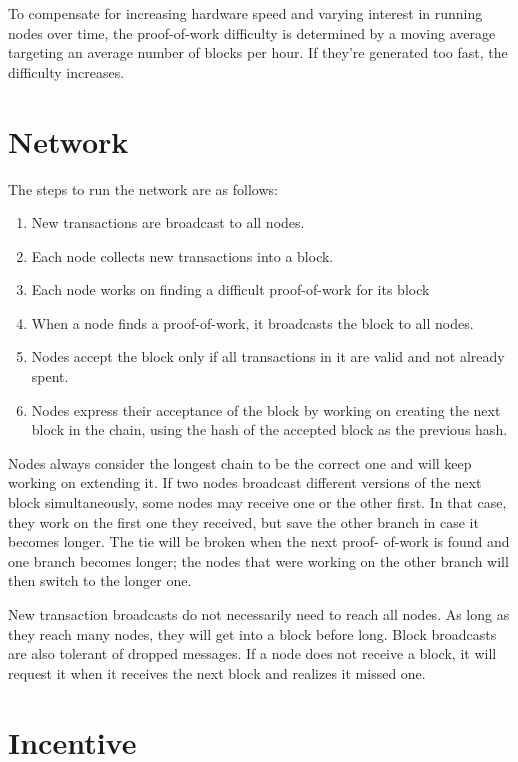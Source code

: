 To compensate for increasing hardware speed and varying interest in running nodes over time, the proof-of-work difficulty is determined by a moving average targeting an average number of blocks per hour. If they're generated too fast, the difficulty increases.

\section{Network}

The steps to run the network are as follows:
\begin{enumerate}
	\item New transactions are broadcast to all nodes.
	\item Each node collects new transactions into a block.
	\item Each node works on finding a difficult proof-of-work for its block
	\item When a node finds a proof-of-work, it broadcasts the block to all nodes.
	\item Nodes accept the block only if all transactions in it are valid and not already spent.
	\item Nodes express their acceptance of the block by working on creating the next block in the chain, using the hash of the accepted block as the previous hash.
\end{enumerate}

Nodes always consider the longest chain to be the correct one and will keep working on extending it. If two nodes broadcast different versions of the next block simultaneously, some nodes may receive one or the other first. In that case, they work on the first one they received, but save the other branch in case it becomes longer. The tie will be broken when the next proof- of-work is found and one branch becomes longer; the nodes that were working on the other branch will then switch to the longer one.

New transaction broadcasts do not necessarily need to reach all nodes. As long as they reach many nodes, they will get into a block before long. Block broadcasts are also tolerant of dropped messages. If a node does not receive a block, it will request it when it receives the next block and realizes it missed one.

\section{Incentive}

